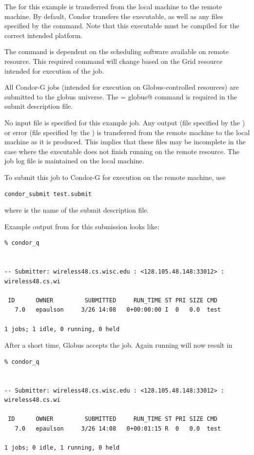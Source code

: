The 
for this example is
transferred from the local machine to the remote machine.
By default, Condor transfers the executable, as well as any
files specified by the  command.
Note that this executable must be compiled for the correct
intended platform.

The  command is dependent on the
scheduling software available on remote resource.
This required command will change based on the Grid resource
intended for execution of the job.

All Condor-G jobs (intended for execution on Globus-controlled
resources) are submitted to the globus universe.
The \verb@universe = globus@ command is required
in the submit description file.

No input file is specified for this example job.
Any output (file specified by the )
or error (file specified by the )
is transferred 
from the remote machine to the local machine as it is produced.
This implies that these files may be incomplete in the case
where the executable does not finish running on the remote resource.
The job log file is maintained on the local machine.

To submit this job to Condor-G for execution on the
remote machine, use
\begin{verbatim}
condor_submit test.submit
\end{verbatim}
where  is the name of the submit description file.

Example output from 
 for this submission looks like:
\begin{verbatim}
% condor_q


-- Submitter: wireless48.cs.wisc.edu : <128.105.48.148:33012> : wireless48.cs.wi

 ID      OWNER         SUBMITTED     RUN_TIME ST PRI SIZE CMD
   7.0   epaulson     3/26 14:08   0+00:00:00 I  0   0.0  test

1 jobs; 1 idle, 0 running, 0 held
\end{verbatim}

After a short time, Globus accepts the job.
Again running  will now result in

\begin{verbatim}
% condor_q


-- Submitter: wireless48.cs.wisc.edu : <128.105.48.148:33012> : wireless48.cs.wi

 ID      OWNER         SUBMITTED     RUN_TIME ST PRI SIZE CMD
   7.0   epaulson     3/26 14:08   0+00:01:15 R  0   0.0  test

1 jobs; 0 idle, 1 running, 0 held
\end{verbatim}

